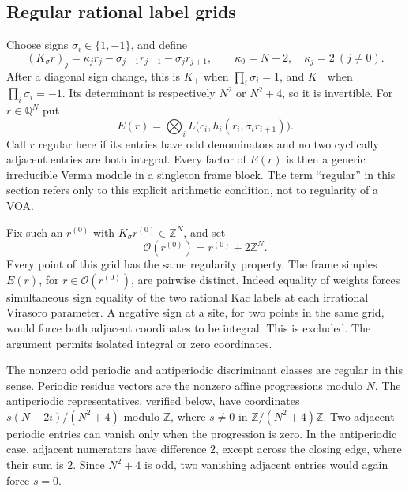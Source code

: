 \documentclass[11pt,a4paper]{article}
\numberwithin{equation}{section}
\theoremstyle{definition}\newtheorem{definition}[theorem]{Definition}
\theoremstyle{remark}\newtheorem{remark}[theorem]{Remark}
\begin{document}
\subsection{Regular rational label grids}
Choose signs $\sigma_i\in\{1,-1\}$, and define
\[
 (K_\sigma r)_j=\kappa_jr_j
                  -\sigma_{j-1}r_{j-1}-\sigma_jr_{j+1},
 \qquad \kappa_0=N+2,\quad\kappa_j=2\ (j\ne0).
\]
After a diagonal sign change, this is $K_+$ when
$\prod_i\sigma_i=1$, and $K_-$ when $\prod_i\sigma_i=-1$.
Its determinant is respectively $N^2$ or $N^2+4$, so it is invertible.
For $r\in\mathbb Q^N$ put
\[
 E(r)=\bigotimes_i L\bigl(c_i,h_i(r_i,\sigma_i r_{i+1})\bigr).
\]
Call $r$ regular here if its entries have odd denominators and
no two cyclically adjacent entries are both integral. Every factor
of $E(r)$ is then a generic irreducible Verma module in a singleton
frame block. The term ``regular'' in this section refers only to
this explicit arithmetic condition, not to regularity of a VOA.

Fix such an $r^{(0)}$ with $K_\sigma r^{(0)}\in\mathbb Z^N$, and set
\[
 \mathcal O(r^{(0)})=r^{(0)}+2\mathbb Z^N.
\]
Every point of this grid has the same regularity property. The frame
simples $E(r)$, for $r\in\mathcal O(r^{(0)})$, are pairwise distinct.
Indeed equality of weights forces simultaneous sign equality of the
two rational Kac labels at each irrational Virasoro parameter. A
negative sign at a site, for two points in the same grid, would force
both adjacent coordinates to be integral. This is excluded. The
argument permits isolated integral or zero coordinates.

The nonzero odd periodic and antiperiodic discriminant classes are
regular in this sense.  Periodic residue vectors are the nonzero
affine progressions modulo $N$.  The antiperiodic representatives,
verified below, have coordinates $s(N-2i)/(N^2+4)$ modulo
$\mathbb Z$, where $s\ne0$ in $\mathbb Z/(N^2+4)\mathbb Z$.
Two adjacent periodic entries can vanish only when the progression
is zero.  In the antiperiodic case, adjacent numerators have
difference $2$, except across the closing edge, where their sum is
$2$.  Since $N^2+4$ is odd, two vanishing adjacent entries would
again force $s=0$.
\end{document}
